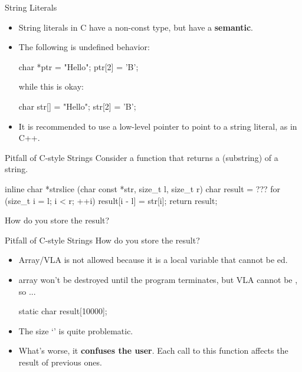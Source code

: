\documentclass[handout]{beamer}
\begin{document}
\begin{frame}[fragile]{String Literals}
    \begin{itemize}
        \item String literals in C have a non-const type, but have a \textbf{ semantic}.
        \item The following is undefined behavior:
        \begin{cpp}
char *ptr = "Hello";
ptr[2] = 'B';
        \end{cpp}
        while this is okay:
        \begin{cpp}
char str[] = "Hello";
str[2] = 'B';
        \end{cpp}
        \pause
        \item It is recommended to use a low-level  pointer to point to a string literal, as in C++.
    \end{itemize}
\end{frame}

\begin{frame}[fragile]{Pitfall of C-style Strings}
    Consider a function that returns a  (substring) of a string.
    \begin{cpp}
inline char *strslice
    (char const *str, size_t l, size_t r) {
  char result = ???
  for (size_t i = l; i < r; ++i)
    result[i - l] = str[i];
  return result;
}
    \end{cpp}
    How do you store the result?
\end{frame}

\begin{frame}[fragile]{Pitfall of C-style Strings}
    How do you store the result?
    \begin{itemize}
        \pause
        \item Array/VLA is not allowed because it is a local variable that cannot be ed.
        \pause
        \item {} array won't be destroyed until the program terminates, but VLA cannot be , so ...
        \begin{cpp}
static char result[10000];
        \end{cpp}
        \item The size `' is quite problematic.
        \pause
        \item What's worse, it \textbf{confuses the user}. Each call to this function affects the result of previous ones.
    \end{itemize}
\end{frame}
\end{document}
